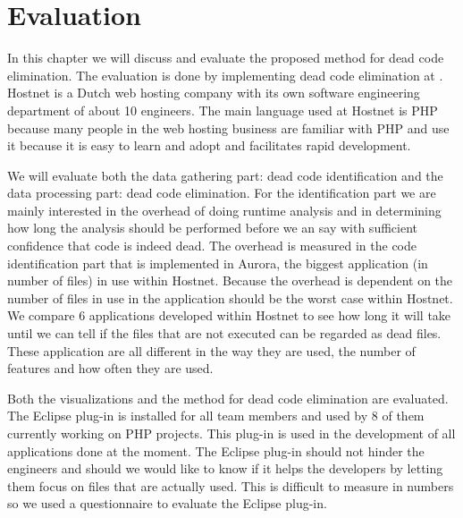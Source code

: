 




\chapter{Evaluation}
\label{ch:evaluation}

In this chapter we will discuss and evaluate the proposed method for dead code elimination. The evaluation is done by implementing dead code elimination at . Hostnet is a Dutch web hosting company with its own software engineering department of about 10 engineers. The main language used at Hostnet is PHP because many people in the web hosting business are familiar with PHP and use it because it is easy to learn and adopt and facilitates rapid development.

We will evaluate both the data gathering part: dead code identification and the data processing part: dead code elimination. For the identification part we are mainly interested in the overhead of doing runtime analysis and in determining how long the analysis should be performed before we an say with sufficient confidence that code is indeed dead. The overhead is measured in the code identification part that is implemented in Aurora, the biggest application (in number of files) in use within Hostnet. Because the overhead is dependent on the number of files in use in the application should be the worst case within Hostnet. We compare 6 applications developed within Hostnet to see how long it will take until we can tell if the files that are not executed can be regarded as dead files. These application are all different in the way they are used, the number of features and how often they are used.

Both the visualizations and the method for dead code elimination are evaluated. The Eclipse plug-in  is installed for all team members and used by 8 of them currently working on PHP projects. This plug-in is used in the development of all applications done at the moment. The Eclipse plug-in should not hinder the engineers and should we would like to know if it helps the developers by letting them focus on files that are actually used. This is difficult to measure in numbers so we used a questionnaire to evaluate the Eclipse plug-in.

